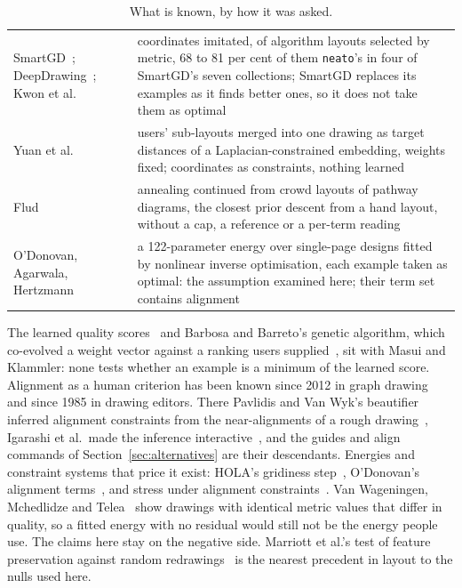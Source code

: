 \documentclass[11pt]{article}
\begin{document}
\begin{table}[!htbp]
\begin{tabular}{@{}>{\raggedright\arraybackslash}p{4.2cm}>{\raggedright\arraybackslash}p{10.2cm}@{}}
SmartGD~\cite{smartgd24}; DeepDrawing~\cite{deepdrawing19}; Kwon et al.\ \cite{kwon18} & coordinates imitated, of algorithm layouts selected by metric, 68 to 81 per cent of them \texttt{neato}'s in four of SmartGD's seven collections; SmartGD replaces its examples as it finds better ones, so it does not take them as optimal \\[2pt]
Yuan et al.\ \cite{yuan12} & users' sub-layouts merged into one drawing as target distances of a Laplacian-constrained embedding, weights fixed; coordinates as constraints, nothing learned \\[2pt]
Flud~\cite{flud22} & annealing continued from crowd layouts of pathway diagrams, the closest prior descent from a hand layout, without a cap, a reference or a per-term reading \\[2pt]
O'Donovan, Agarwala, Hertzmann~\cite{odonovan14} & a 122-parameter energy over single-page designs fitted by nonlinear inverse optimisation, each example taken as optimal: the assumption examined here; their term set contains alignment \\
\bottomrule
\end{tabular}
\caption{What is known, by how it was asked.}
\label{tab:related}
\end{table}

The learned quality scores~\cite{kwon18, haleem19, huang16} and Barbosa and Barreto's
genetic algorithm, which co-evolved a weight vector against a ranking users
supplied~\cite{barbosa01}, sit with Masui and Klammler: none tests whether an example is a minimum of the
learned score. Alignment as a human criterion has been known since 2012 in graph
drawing~\cite{purchase12} and since 1985 in drawing editors. There Pavlidis and Van Wyk's
beautifier inferred alignment constraints from the near-alignments of a rough
drawing~\cite{pvw85}, Igarashi et al.\ made the inference interactive~\cite{igarashi97},
and the guides and align commands of Section~\ref{sec:alternatives} are their descendants. Energies and constraint systems that price it exist: HOLA's gridiness
step~\cite{hola16}, O'Donovan's alignment terms~\cite{odonovan14}, and stress under
alignment constraints~\cite{ipsepcola06, dunnart08, setcola18}. Van Wageningen,
Mchedlidze and Telea~\cite{wageningen25} show drawings with identical metric values that
differ in quality, so a fitted energy with no residual would still not be the energy
people use. The claims here stay on the negative side. Marriott et al.'s test of feature
preservation against random redrawings~\cite{marriott12} is the nearest precedent in
layout to the nulls used here.
\end{document}
